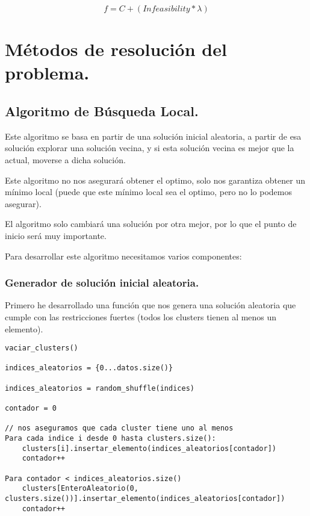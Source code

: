 \documentclass[12pt, spanish]{article}
\begin{document}
$$ f = C + (\textit{Infeasibility} * \lambda) $$ 


\newpage

\section{Métodos de resolución del problema.}

\subsection{Algoritmo de Búsqueda Local.}

Este algoritmo se basa en partir de una solución inicial aleatoria, a partir de esa solución explorar una solución vecina, y si esta solución vecina es mejor que la actual, moverse a dicha solución.

Este algoritmo no nos asegurará obtener el optimo, solo nos garantiza obtener un mínimo local (puede que este mínimo local sea el optimo, pero no lo podemos asegurar).

El algoritmo solo cambiará una solución por otra mejor, por lo que el punto de inicio será muy importante.

Para desarrollar este algoritmo necesitamos varios componentes:
 
 \subsubsection{Generador de solución inicial aleatoria.}
 
 Primero he desarrollado una función que nos genera una solución aleatoria que cumple con las restricciones fuertes (todos los clusters tienen al menos un elemento).
 
 \begin{lstlisting}
vaciar_clusters()

indices_aleatorios = {0...datos.size()}

indices_aleatorios = random_shuffle(indices)

contador = 0

// nos aseguramos que cada cluster tiene uno al menos
Para cada indice i desde 0 hasta clusters.size():
	clusters[i].insertar_elemento(indices_aleatorios[contador])
	contador++
	
Para contador < indices_aleatorios.size()
	clusters[EnteroAleatorio(0, clusters.size())].insertar_elemento(indices_aleatorios[contador])
	contador++
	

\end{lstlisting}
 
\end{document}
